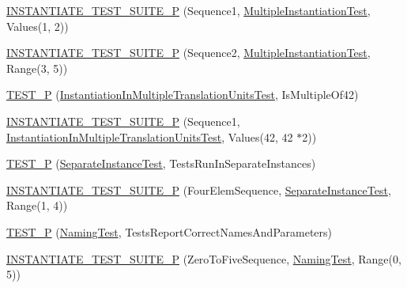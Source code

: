 \begin{DoxyCompactItemize}
\item 
\mbox{\hyperlink{googletest-master_2googletest_2test_2googletest-param-test-test_8cc_a0a3fa5eeb95de2a56489864c2437e2ad}{I\+N\+S\+T\+A\+N\+T\+I\+A\+T\+E\+\_\+\+T\+E\+S\+T\+\_\+\+S\+U\+I\+T\+E\+\_\+P}} (Sequence1, \mbox{\hyperlink{class_multiple_instantiation_test}{Multiple\+Instantiation\+Test}}, Values(1, 2))
\item 
\mbox{\hyperlink{googletest-master_2googletest_2test_2googletest-param-test-test_8cc_a0e7002f6418f9df074f641bbc5ed2578}{I\+N\+S\+T\+A\+N\+T\+I\+A\+T\+E\+\_\+\+T\+E\+S\+T\+\_\+\+S\+U\+I\+T\+E\+\_\+P}} (Sequence2, \mbox{\hyperlink{class_multiple_instantiation_test}{Multiple\+Instantiation\+Test}}, Range(3, 5))
\item 
\mbox{\hyperlink{googletest-master_2googletest_2test_2googletest-param-test-test_8cc_a08ff04af48f7685f0ccd9adf4adc1cda}{T\+E\+S\+T\+\_\+P}} (\mbox{\hyperlink{class_instantiation_in_multiple_translation_units_test}{Instantiation\+In\+Multiple\+Translation\+Units\+Test}}, Is\+Multiple\+Of42)
\item 
\mbox{\hyperlink{googletest-master_2googletest_2test_2googletest-param-test-test_8cc_a139ab089376ec6854c62cd7db2dd6c29}{I\+N\+S\+T\+A\+N\+T\+I\+A\+T\+E\+\_\+\+T\+E\+S\+T\+\_\+\+S\+U\+I\+T\+E\+\_\+P}} (Sequence1, \mbox{\hyperlink{class_instantiation_in_multiple_translation_units_test}{Instantiation\+In\+Multiple\+Translation\+Units\+Test}}, Values(42, 42 $\ast$2))
\item 
\mbox{\hyperlink{googletest-master_2googletest_2test_2googletest-param-test-test_8cc_ae517694af7a7a007acd12e9a7247afe9}{T\+E\+S\+T\+\_\+P}} (\mbox{\hyperlink{class_separate_instance_test}{Separate\+Instance\+Test}}, Tests\+Run\+In\+Separate\+Instances)
\item 
\mbox{\hyperlink{googletest-master_2googletest_2test_2googletest-param-test-test_8cc_a9e6e439e505cb20d67aa06a1c6d0e9af}{I\+N\+S\+T\+A\+N\+T\+I\+A\+T\+E\+\_\+\+T\+E\+S\+T\+\_\+\+S\+U\+I\+T\+E\+\_\+P}} (Four\+Elem\+Sequence, \mbox{\hyperlink{class_separate_instance_test}{Separate\+Instance\+Test}}, Range(1, 4))
\item 
\mbox{\hyperlink{googletest-master_2googletest_2test_2googletest-param-test-test_8cc_a1f8ae152b21130f3ca99bdeab97e872a}{T\+E\+S\+T\+\_\+P}} (\mbox{\hyperlink{class_naming_test}{Naming\+Test}}, Tests\+Report\+Correct\+Names\+And\+Parameters)
\item 
\mbox{\hyperlink{googletest-master_2googletest_2test_2googletest-param-test-test_8cc_a87cac0101217b77e84179b68e19cf84b}{I\+N\+S\+T\+A\+N\+T\+I\+A\+T\+E\+\_\+\+T\+E\+S\+T\+\_\+\+S\+U\+I\+T\+E\+\_\+P}} (Zero\+To\+Five\+Sequence, \mbox{\hyperlink{class_naming_test}{Naming\+Test}}, Range(0, 5))

\end{DoxyCompactItemize}

